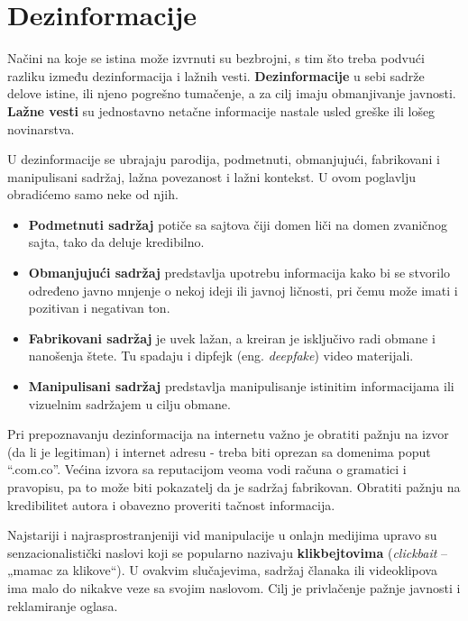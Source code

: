 \documentclass[a4paper]{article}
\begin{document}
\newpage
\section{Dezinformacije}
\label{sec:naslov3}

Načini na koje se istina može izvrnuti su bezbrojni, s tim što treba podvući razliku između dezinformacija i lažnih vesti. \newline \textbf{Dezinformacije} u sebi sadrže delove istine, ili njeno pogrešno tumačenje, a za cilj imaju obmanjivanje javnosti. \newline \textbf{Lažne vesti} su jednostavno netačne informacije nastale usled greške ili lošeg novinarstva.    


U dezinformacije se ubrajaju parodija, podmetnuti, obmanjujući, fabrikovani i manipulisani sadržaj, lažna povezanost i lažni kontekst. U ovom poglavlju obradićemo samo neke od njih.


\begin{itemize}
    \item \textbf{Podmetnuti sadržaj} potiče sa sajtova čiji domen liči na domen zvaničnog sajta, tako da deluje kredibilno.
    \item \textbf{Obmanjujući sadržaj} predstavlja upotrebu informacija kako bi se stvorilo određeno javno mnjenje o nekoj ideji ili javnoj ličnosti, pri čemu može imati i pozitivan i negativan ton.
    \item \textbf{Fabrikovani sadržaj} je uvek lažan, a kreiran je isključivo radi obmane i nanošenja štete. Tu spadaju i dipfejk \cite{deepfake} (eng. \emph{deepfake}) video materijali.
    \item \textbf{Manipulisani sadržaj} predstavlja manipulisanje istinitim informacijama ili vizuelnim sadržajem u cilju obmane.
\end{itemize}


Pri prepoznavanju dezinformacija na internetu važno je obratiti pažnju na izvor (da li je legitiman) i internet adresu - treba biti oprezan sa domenima poput “.com.co”. Većina izvora sa reputacijom veoma vodi računa o gramatici i pravopisu, pa to može biti pokazatelj da je sadržaj fabrikovan. Obratiti pažnju na kredibilitet autora i obavezno proveriti tačnost informacija.


Najstariji i najrasprostranjeniji vid manipulacije u onlajn medijima upravo su 
senzacionalistički naslovi koji se popularno nazivaju \textbf{klikbejtovima} \cite{clickbait} (\emph{clickbait} – „mamac za klikove“). U ovakvim slučajevima, sadržaj članaka ili videoklipova ima malo do nikakve veze sa svojim naslovom. Cilj je privlačenje pažnje javnosti i reklamiranje oglasa. 
\end{document}
